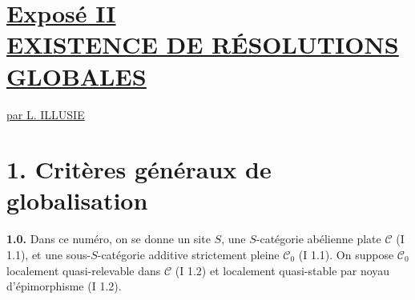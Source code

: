 \documentclass[11pt]{article}
\begin{document}
\providecommand{\cS}{\mathcal S}
\providecommand{\cCz}{\mathcal C_0}
\providecommand{\cCone}{\mathcal C_1}
\providecommand{\cA}{\mathcal A}
\providecommand{\cB}{\mathcal B}
\providecommand{\cL}{\mathcal L}
\providecommand{\cI}{\mathcal I}
\providecommand{\cJ}{\mathcal J}
\providecommand{\Db}{\mathrm D}
\providecommand{\Kb}{\mathrm K}
\providecommand{\Dminus}{\mathrm D^{-}}
\providecommand{\Kminus}{\mathrm K^{-}}
\providecommand{\Kbd}{\mathrm K^{b}}
\providecommand{\Mod}{\operatorname{Mod}}
\providecommand{\Lib}{\operatorname{Lib}}
\providecommand{\Loclib}{\operatorname{Loclib}}
\providecommand{\Qcoh}{\operatorname{Qcoh}}
\providecommand{\Coh}{\operatorname{Coh}}
\providecommand{\Ext}{\operatorname{Ext}}
\providecommand{\Hom}{\operatorname{Hom}}
\renewcommand{\Ob}{\operatorname{ob}}
\providecommand{\im}{\operatorname{Im}}
\providecommand{\coker}{\operatorname{Coker}}
\providecommand{\coh}{\operatorname{coh}}
\providecommand{\parf}{\operatorname{parf}}
\providecommand{\amp}{\operatorname{amp}}
\providecommand{\RHom}{\operatorname{RHom}}


\section*{\underline{Exposé II}\\[3pt] \underline{\underline{EXISTENCE DE RÉSOLUTIONS GLOBALES}}}
\begin{center}
\underline{par L. ILLUSIE}
\end{center}

\section*{1. Critères généraux de globalisation}

\textbf{1.0.} Dans ce numéro, on se donne un site $S$, une $S$-catégorie abélienne plate $\mathcal C$ (I 1.1), et une sous-$S$-catégorie additive strictement pleine $\mathcal C_0$ (I 1.1). On suppose $\mathcal C_0$ localement quasi-relevable dans $\mathcal C$ (I 1.2) et localement quasi-stable par noyau d'épimorphisme (I 1.2).
\end{document}
